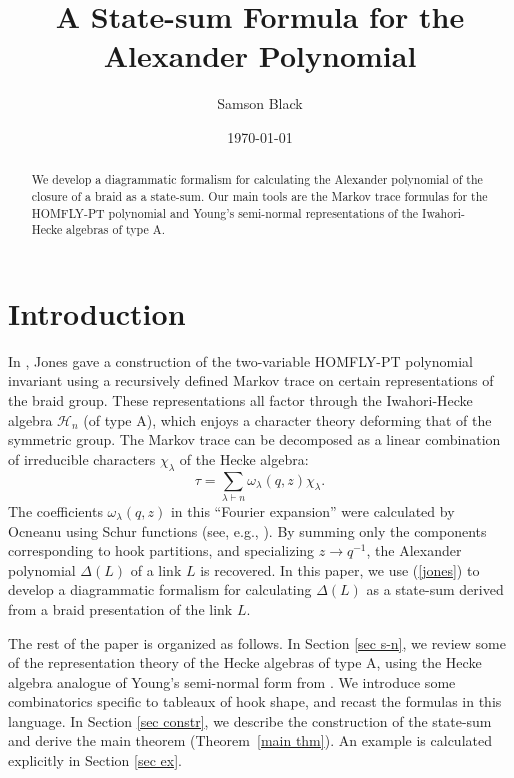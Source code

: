 \documentclass [12pt, letterpaper, oneside] {amsart}
\title {A State-sum Formula for the Alexander Polynomial}
\date {\today}
\author {Samson Black}
\renewcommand \l {\lambda}
\newcommand \mc {\mathcal}
\theoremstyle {plain}
\begin{document}
\begin {abstract}
We develop a diagrammatic formalism for calculating the Alexander polynomial of the closure of a braid as a state-sum.  Our main tools are the Markov trace formulas for the HOMFLY-PT polynomial and Young's semi-normal representations of the Iwahori-Hecke algebras of type A.
\end {abstract}

\maketitle

\section {Introduction}

In \cite {Jones}, Jones gave a construction of the two-variable HOMFLY-PT polynomial invariant using a recursively defined Markov trace on 
certain representations of the braid group.  These representations all factor through the Iwahori-Hecke algebra $\mc{H}_n$ (of type A), which enjoys a character theory \cite {Geck} deforming that of the symmetric group.  The Markov trace can be decomposed as a linear combination of irreducible characters $\chi_\l$ of the Hecke algebra:
\begin {equation}\label{jones}
\tau = \sum_{\l \vdash n} \omega_\l(q,z) \chi_\l.
\end {equation}
The coefficients $\omega_\l(q,z)$ in this ``Fourier expansion'' were calculated by Ocneanu using Schur functions (see, e.g., \cite {GeckJacon}).  By summing only the components corresponding to hook partitions, and specializing $z \to q^{-1}$, the Alexander polynomial $\Delta(L)$ of a link $L$ is recovered.
In this paper, we use (\ref{jones}) to develop a diagrammatic formalism for calculating $\Delta(L)$ as a state-sum derived from a braid presentation of the link $L$.  

The rest of the paper is organized as follows.
In Section \ref {sec s-n}, we review some of the representation theory of the Hecke algebras of type A, using the Hecke algebra analogue of Young's semi-normal form from \cite {Hoefsmit}.  We introduce some combinatorics specific to tableaux of hook shape, and recast the formulas in this language.
In Section \ref {sec constr}, we describe the construction of the state-sum and derive the main theorem (Theorem~\ref {main thm}).  An example is calculated explicitly in Section \ref {sec ex}.  
\end{document}
